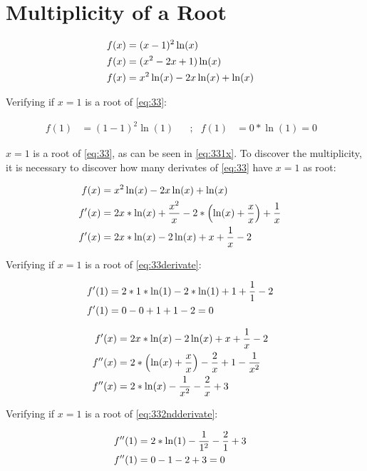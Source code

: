 \section{Multiplicity of a Root}

	\begin{align}
		f(x) &= (x-1)^{2}\ln(x)& \notag \\
		f(x) &= (x^{2} - 2x + 1)\ln(x)& \notag \\
		f(x) &= x^{2}\ln(x) - 2x\ln(x) + \ln(x)&
	\label{eq:33}
	\end{align}

	Verifying if $x=1$ is a root of \cref{eq:33}:

	\begin{align}
		f(1) &= (1-1)^{2}\ln(1)& &;&
		f(1) &= 0*\ln(1) = 0&
	\label{eq:331x}
	\end{align}

	$x=1$ is a root of \cref{eq:33}, as can be seen in \cref{eq:331x}. To discover the multiplicity, it is necessary to discover how many derivates of \cref{eq:33} have $x=1$ as root:

	\begin{align}
		f(x) &= x^{2}\ln(x) - 2x\ln(x) + \ln(x)& \notag \\
		f'(x) &= 2x*\ln(x) + \frac{x^{2}}{x} -2 * \left( \ln(x) + \frac{x}{x} \right) + \frac{1}{x}& \notag \\
		f'(x) &= 2x*\ln(x) - 2\ln(x) + x  + \frac{1}{x} - 2&
	\label{eq:33derivate}
	\end{align}

	Verifying if $x=1$ is a root of \cref{eq:33derivate}:

	\begin{align}
		f'(1) &= 2*1*\ln(1) - 2*\ln(1) + 1 + \frac{1}{1} - 2& \notag \\
		f'(1) &= 0 - 0 + 1 + 1 - 2 = 0&
	\label{eq:33derivate1x}
	\end{align}

	\begin{align}
		f'(x) &= 2x*\ln(x) - 2\ln(x) + x  + \frac{1}{x} - 2& \notag \\
		f''(x) &= 2*\left(\ln(x) + \frac{x}{x}\right) - \frac{2}{x} + 1  - \frac{1}{x^2}& \notag \\
		f''(x) &= 2*\ln(x) - \frac{1}{x^2} - \frac{2}{x} + 3&
	\label{eq:332ndderivate}
	\end{align}

	Verifying if $x=1$ is a root of \cref{eq:332ndderivate}:

	\begin{align}
		f''(1) &= 2*\ln(1) - \frac{1}{1^2} - \frac{2}{1} + 3& \notag \\
		f''(1) &= 0 - 1 - 2 + 3 = 0& \notag \\
	\label{eq:332ndderivate1x}
	\end{align}

